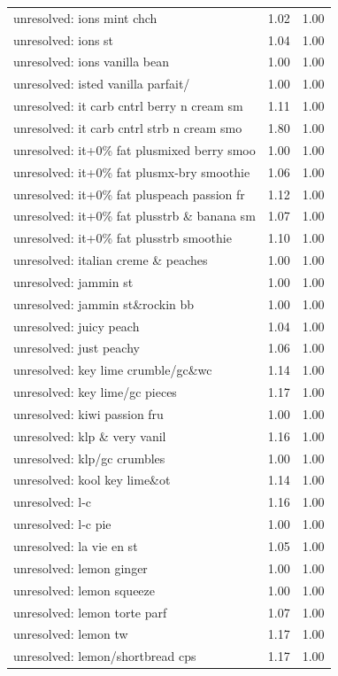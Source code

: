 \begin{table}
\begin{tabular}{lrr}
unresolved: ions mint chch & 1.02 & 1.00 \\
unresolved: ions st & 1.04 & 1.00 \\
unresolved: ions vanilla bean & 1.00 & 1.00 \\
unresolved: isted vanilla parfait/ & 1.00 & 1.00 \\
unresolved: it carb cntrl berry n cream sm & 1.11 & 1.00 \\
unresolved: it carb cntrl strb n cream smo & 1.80 & 1.00 \\
unresolved: it+0\% fat plusmixed berry smoo & 1.00 & 1.00 \\
unresolved: it+0\% fat plusmx-bry smoothie & 1.06 & 1.00 \\
unresolved: it+0\% fat pluspeach passion fr & 1.12 & 1.00 \\
unresolved: it+0\% fat plusstrb \& banana sm & 1.07 & 1.00 \\
unresolved: it+0\% fat plusstrb smoothie & 1.10 & 1.00 \\
unresolved: italian creme \& peaches & 1.00 & 1.00 \\
unresolved: jammin st & 1.00 & 1.00 \\
unresolved: jammin st\&rockin bb & 1.00 & 1.00 \\
unresolved: juicy peach & 1.04 & 1.00 \\
unresolved: just peachy & 1.06 & 1.00 \\
unresolved: key lime crumble/gc\&wc & 1.14 & 1.00 \\
unresolved: key lime/gc pieces & 1.17 & 1.00 \\
unresolved: kiwi passion fru & 1.00 & 1.00 \\
unresolved: klp \& very vanil & 1.16 & 1.00 \\
unresolved: klp/gc crumbles & 1.00 & 1.00 \\
unresolved: kool key lime\&ot & 1.14 & 1.00 \\
unresolved: l-c & 1.16 & 1.00 \\
unresolved: l-c pie & 1.00 & 1.00 \\
unresolved: la vie en st & 1.05 & 1.00 \\
unresolved: lemon ginger & 1.00 & 1.00 \\
unresolved: lemon squeeze & 1.00 & 1.00 \\
unresolved: lemon torte parf & 1.07 & 1.00 \\
unresolved: lemon tw & 1.17 & 1.00 \\
unresolved: lemon/shortbread cps & 1.17 & 1.00 \\

\end{tabular}
\end{table}
